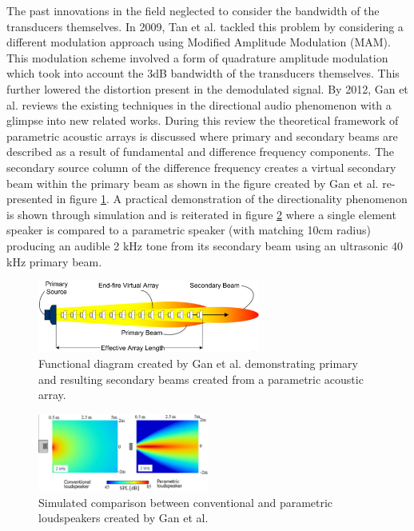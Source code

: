 The past innovations in the field neglected to consider the bandwidth of the transducers themselves. In 2009, Tan et al. \cite{tan2010preprocessing} tackled this problem by considering a different modulation approach using Modified Amplitude Modulation (MAM). This modulation scheme involved a form of quadrature amplitude modulation which took into account the 3dB bandwidth of the transducers themselves. This further lowered the distortion present in the demodulated signal. By 2012, Gan et al. \cite{gan2012review} reviews the existing techniques in the directional audio phenomenon with a glimpse into new related works. During this review the theoretical framework of parametric acoustic arrays is discussed where primary and secondary beams are described as a result of fundamental and difference frequency components. The secondary source column of the difference frequency creates a virtual secondary beam within the primary beam as shown in the figure created by Gan et al. re-presented in figure \ref{fig:ganprisec}\cite{gan2012review}. A practical demonstration of the directionality phenomenon is shown through simulation and is reiterated in figure \ref{fig:gandirectionality}\cite{gan2012review} where a single element speaker is compared to a parametric speaker (with matching 10cm radius) producing an audible 2 kHz tone from its secondary beam using an ultrasonic 40 kHz primary beam.
\begin{figure}[ht!]
    \centering
    \includegraphics[width=0.65\textwidth]{Figures/primsecbeamarrayGan2012review.png}
    \caption{Functional diagram created by Gan et al. demonstrating primary and resulting secondary beams created from a parametric acoustic array.}
    \label{fig:ganprisec}
\end{figure}
\begin{figure}[ht!]
    \centering
    \includegraphics[width=0.5\textwidth]{Figures/2khzDirectionalitygan2012review.png}
    \caption{Simulated comparison between conventional and parametric loudspeakers created by Gan et al.}
    \label{fig:gandirectionality}
\end{figure}

